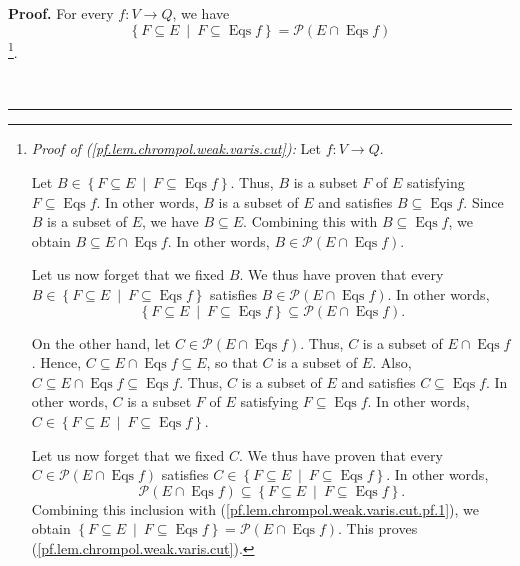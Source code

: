 \documentclass[numbers=enddot,12pt,final,onecolumn,notitlepage]{scrartcl}%
\theoremstyle{definition}
\newenvironment{proof}[1][Proof]{\noindent\textbf{#1.} }{\ \rule{0.5em}{0.5em}}
\newenvironment{verlong}{}{}
\begin{document}
\begin{verlong}
\begin{proof}
For every $f:V\rightarrow Q$, we have%
\begin{equation}
\left\{  F\subseteq E\ \mid\ F\subseteq\operatorname*{Eqs}f\right\}
=\mathcal{P}\left(  E\cap\operatorname*{Eqs}f\right)
\label{pf.lem.chrompol.weak.varis.cut}%
\end{equation}
\footnote{\textit{Proof of (\ref{pf.lem.chrompol.weak.varis.cut}):} Let
$f:V\rightarrow Q$.
\par
Let $B\in\left\{  F\subseteq E\ \mid\ F\subseteq\operatorname*{Eqs}f\right\}
$. Thus, $B$ is a subset $F$ of $E$ satisfying $F\subseteq\operatorname*{Eqs}%
f$. In other words, $B$ is a subset of $E$ and satisfies $B\subseteq
\operatorname*{Eqs}f$. Since $B$ is a subset of $E$, we have $B\subseteq E$.
Combining this with $B\subseteq\operatorname*{Eqs}f$, we obtain $B\subseteq
E\cap\operatorname*{Eqs}f$. In other words, $B\in\mathcal{P}\left(
E\cap\operatorname*{Eqs}f\right)  $.
\par
Let us now forget that we fixed $B$. We thus have proven that every
$B\in\left\{  F\subseteq E\ \mid\ F\subseteq\operatorname*{Eqs}f\right\}  $
satisfies $B\in\mathcal{P}\left(  E\cap\operatorname*{Eqs}f\right)  $. In
other words,%
\begin{equation}
\left\{  F\subseteq E\ \mid\ F\subseteq\operatorname*{Eqs}f\right\}
\subseteq\mathcal{P}\left(  E\cap\operatorname*{Eqs}f\right)  .
\label{pf.lem.chrompol.weak.varis.cut.pf.1}%
\end{equation}
\par
On the other hand, let $C\in\mathcal{P}\left(  E\cap\operatorname*{Eqs}%
f\right)  $. Thus, $C$ is a subset of $E\cap\operatorname*{Eqs}f$. Hence,
$C\subseteq E\cap\operatorname*{Eqs}f\subseteq E$, so that $C$ is a subset of
$E$. Also, $C\subseteq E\cap\operatorname*{Eqs}f\subseteq\operatorname*{Eqs}%
f$. Thus, $C$ is a subset of $E$ and satisfies $C\subseteq\operatorname*{Eqs}%
f$. In other words, $C$ is a subset $F$ of $E$ satisfying $F\subseteq
\operatorname*{Eqs}f$. In other words, $C\in\left\{  F\subseteq E\ \mid
\ F\subseteq\operatorname*{Eqs}f\right\}  $.
\par
Let us now forget that we fixed $C$. We thus have proven that every
$C\in\mathcal{P}\left(  E\cap\operatorname*{Eqs}f\right)  $ satisfies
$C\in\left\{  F\subseteq E\ \mid\ F\subseteq\operatorname*{Eqs}f\right\}  $.
In other words,%
\[
\mathcal{P}\left(  E\cap\operatorname*{Eqs}f\right)  \subseteq\left\{
F\subseteq E\ \mid\ F\subseteq\operatorname*{Eqs}f\right\}  .
\]
Combining this inclusion with (\ref{pf.lem.chrompol.weak.varis.cut.pf.1}), we
obtain $\left\{  F\subseteq E\ \mid\ F\subseteq\operatorname*{Eqs}f\right\}
=\mathcal{P}\left(  E\cap\operatorname*{Eqs}f\right)  $. This proves
(\ref{pf.lem.chrompol.weak.varis.cut}).}.


\end{proof}
\end{verlong}
\end{document}
